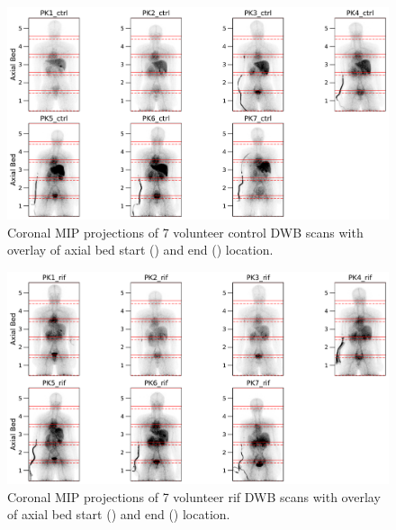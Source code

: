 %
\begin{figure} [ht!]
\centering
\includegraphics[scale=0.5,angle=0]{3_Results/3_1_DWB_Optimization/figures/3_1_MIPS_ctrl.pdf}
\caption{Coronal MIP projections of 7 volunteer control DWB scans with overlay of axial bed start (\protect{}) and end (\protect{}) location.} 
\label{fig3_1:ctrl_mips}
\end{figure}
%
\begin{figure} [ht!]
\centering
\includegraphics[scale=0.5,angle=0]{3_Results/3_1_DWB_Optimization/figures/3_1_MIPS_rif.pdf}
\caption{Coronal MIP projections of 7 volunteer rif DWB scans with overlay of axial bed start (\protect{}) and end (\protect{}) location.} 
\label{fig3_1:rif_mips}
\end{figure}
%
%
%
